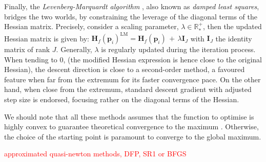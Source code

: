 \documentclass[long, final]{jobim}
\newcommand \RR {\mathbb{R}}
\begin{document}
Finally, the \textit{Levenberg-Marquardt algorithm} \citep{levenberg44, marquardt63}, also known as \textit{damped least squares}, bridges the two worlds, by constraining the leverage of the diagonal terms of the Hessian matrix. Precisely, consider a scaling parameter, $\lambda \in \RR^+_*$, then the updated Hessian matrix is given by: $\mathbf{H}_f(\boldsymbol{p}_i)^{\text{LM}}=\mathbf{H}_f(\boldsymbol{p}_i) \, + \, \lambda \boldsymbol{I}_J$ with $\boldsymbol{I}_J$ the identity matrix of rank $J$. Generally, $\lambda$ is regularly updated during the iteration process. When tending to 0, (the modified Hessian expression is hence close to the original Hessian), the descent direction is close to a second-order method, a favoured feature when far from the extremum for its faster convergence pace. On the other hand, when close from the extremum, standard descent gradient with adjusted step size is endorsed, focusing rather on the diagonal terms of the Hessian. 


We should note that all these methods assumes that the function to optimise is highly convex to guarantee theoretical convergence to the maximum \citep{solomon15, boyd_etal04}. Otherwise, the choice of the starting point is paramount to converge to the global maximum. 



\textcolor{red}{approximated quasi-newton methods, DFP, SR1 or BFGS}



    
\end{document}
